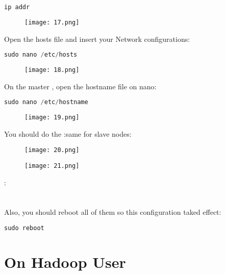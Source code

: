 \documentclass[onecolumn]{article}
\begin{document}
\begin{lstlisting}[language=Python, caption= a ]
ip addr
\end{lstlisting}

\begin{figure}[ht!]
\centering
\texttt{[image: 17.png]}
\caption{\label{}}
\end{figure}

Open the hosts file and insert your Network configurations:

\begin{lstlisting}[language=Python, caption= a ]
sudo nano /etc/hosts
\end{lstlisting}

\begin{figure}[ht!]
\centering
\texttt{[image: 18.png]}
\caption{\label{}}
\end{figure}

On the master , open the hostname file on nano:

\begin{lstlisting}[language=Python, caption= a ]
sudo nano /etc/hostname
\end{lstlisting}

\begin{figure}[ht!]
\centering
\texttt{[image: 19.png]}
\caption{\label{}}
\end{figure}
You should do the :same for slave nodes:

\begin{figure}[ht!]
\centering
\texttt{[image: 20.png]}
\caption{\label{}}
\end{figure}

\begin{figure}[ht!]
\centering
\texttt{[image: 21.png]}
\caption{\label{}}
\end{figure}

:\\\\\\

Also, you should reboot all of them so this configuration taked effect:

\begin{lstlisting}[language=Python, caption= a ]
sudo reboot
\end{lstlisting}

\section{On Hadoop User}
\end{document}
